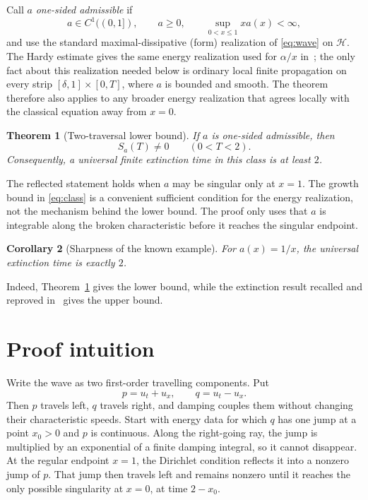 \documentclass[11pt]{article}
\newtheorem{theorem}{Theorem}
\newtheorem{corollary}[theorem]{Corollary}
\newcommand{\Hh}{\mathcal H}
\begin{document}
Call $a$ \emph{one-sided admissible} if
\begin{equation}\label{eq:class}
 a\in C^1((0,1]),\qquad a\geq0,\qquad
 \sup_{0<x\leq1}x a(x)<\infty,
\end{equation}
and use the standard maximal-dissipative (form) realization of
\eqref{eq:wave} on $\Hh$.  The Hardy estimate gives the same energy
realization used for $\alpha/x$ in~\cite{FHS}; the only fact about this
realization needed below is ordinary local finite propagation on every
strip $[\delta,1]\times[0,T]$, where $a$ is bounded and smooth.  The theorem
therefore also applies to any broader energy realization that agrees locally
with the classical equation away from $x=0$.

\begin{theorem}[Two-traversal lower bound]\label{thm:main}
If $a$ is one-sided admissible, then
\[
 S_a(T)\neq0\qquad(0<T<2).
\]
Consequently, a universal finite extinction time in this class is at least
$2$.
\end{theorem}

The reflected statement holds when $a$ may be singular only at $x=1$.
The growth bound in \eqref{eq:class} is a convenient sufficient condition
for the energy realization, not the mechanism behind the lower bound.  The
proof only uses that $a$ is integrable along the broken characteristic before
it reaches the singular endpoint.

\begin{corollary}[Sharpness of the known example]\label{cor:sharp}
For $a(x)=1/x$, the universal extinction time is exactly $2$.
\end{corollary}

Indeed, Theorem~\ref{thm:main} gives the lower bound, while the extinction
result recalled and reproved in~\cite{FHS} gives the upper bound.

\section{Proof intuition}

Write the wave as two first-order travelling components.  Put
\[
 p=u_t+u_x,\qquad q=u_t-u_x.
\]
Then $p$ travels left, $q$ travels right, and damping couples them without
changing their characteristic speeds.  Start with energy data for which
$q$ has one jump at a point $x_0>0$ and $p$ is continuous.  Along the
right-going ray, the jump is multiplied by an exponential of a finite
damping integral, so it cannot disappear.  At the regular endpoint $x=1$,
the Dirichlet condition reflects it into a nonzero jump of $p$.  That jump
then travels left and remains nonzero until it reaches the only possible
singularity at $x=0$, at time $2-x_0$.
\end{document}
